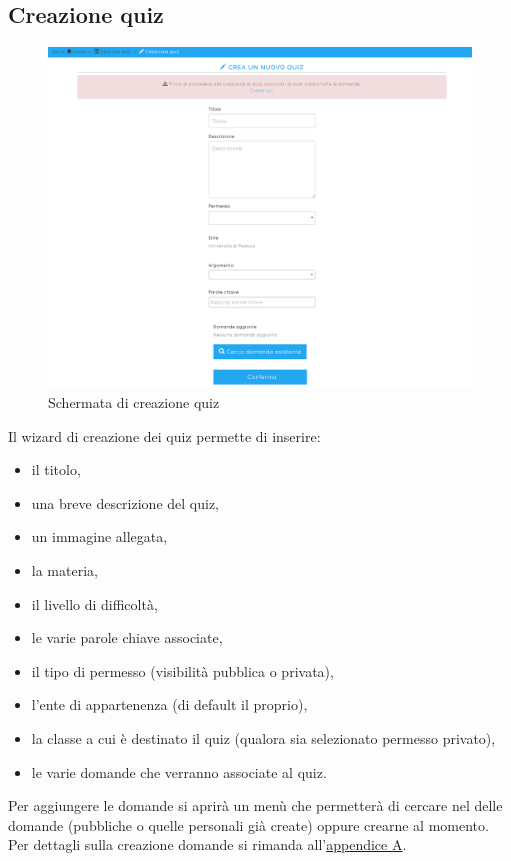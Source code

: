 \documentclass[a4paper, titlepage]{article}
\begin{document}
	 \newpage
	 \subsection{Creazione quiz}
	 \begin{figure}[!h]
	 	\centering
	 	\includegraphics[scale=0.33]{Img/screen_CreazioneQuiz.png}
	 	\caption{Schermata di creazione quiz}
	 \end{figure}
	 Il wizard di creazione dei quiz permette di inserire:
	 \begin{itemize}
	 	\item il titolo,
	 	\item una breve descrizione del quiz,
	 	\item un immagine allegata,
	 	\item la materia,
	 	\item il livello di difficoltà,
	 	\item le varie parole chiave associate,
	 	\item il tipo di permesso (visibilità pubblica o privata),
	 	\item l'ente di appartenenza (di default il proprio),
	 	\item la classe a cui è destinato il quiz (qualora sia selezionato permesso privato),
	 	\item le varie domande che verranno associate al quiz.
	 \end{itemize}
	 Per aggiungere le domande si aprirà un menù che permetterà di cercare nel  delle domande (pubbliche o quelle personali già create) oppure crearne al momento. Per dettagli sulla creazione domande si rimanda all'\hyperref[domande]{appendice A}.
	 
\end{document}
